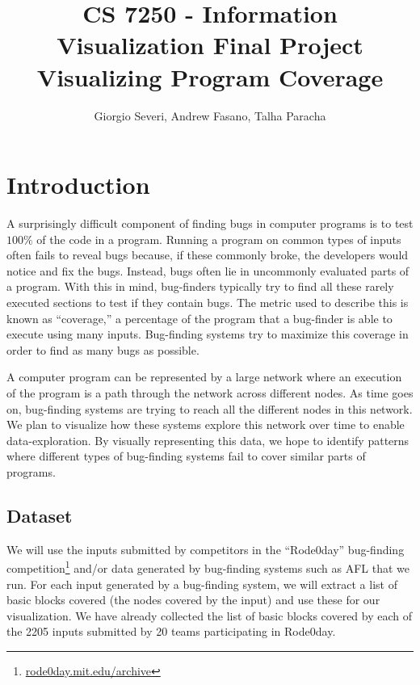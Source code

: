 \documentclass{article}
\title{CS 7250 - Information Visualization Final Project\\
Visualizing Program Coverage}
\author{Giorgio Severi, Andrew Fasano, Talha Paracha}
\date{}
\begin{document}
\maketitle


\begin{abstract}
	
\end{abstract}

\section{Introduction}

A surprisingly difficult component of finding bugs in computer programs is to test $100\%$ of the code in a program. Running a program on common types of inputs often fails to reveal bugs because, if these commonly broke, the developers would notice and fix the bugs. Instead, bugs often lie in uncommonly evaluated parts of a program. With this in mind, bug-finders typically try to find all these rarely executed sections to test if they contain bugs. The metric used to describe this is known as “coverage,” a percentage of the program that a bug-finder is able to execute using many inputs. Bug-finding systems try to maximize this coverage in order to find as many bugs as possible.

A computer program can be represented by a large network where an execution of the program is a path through the network across different nodes. As time goes on, bug-finding systems are trying to reach all the different nodes in this network. We plan to visualize how these systems explore this network over time to enable data-exploration. By visually representing this data, we hope to identify patterns where different types of bug-finding systems fail to cover similar parts of programs.

\subsection{Dataset}

We will use the inputs submitted by competitors in the “Rode0day” bug-finding competition\footnote{\url{rode0day.mit.edu/archive}} and/or data generated by bug-finding systems such as AFL that we run. For each input generated by a bug-finding system, we will extract a list of basic blocks covered (the nodes covered by the input) and use these for our visualization. We have already collected the list of basic blocks covered by each of the 2205 inputs submitted by 20 teams participating in Rode0day.
\end{document}
